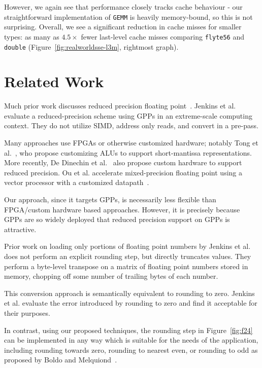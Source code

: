 \documentclass{sig-alternate-05-2015}
\begin{document}
However, we again see that performance closely tracks cache behaviour - our
straightforward implementation of \texttt{GEMM} is heavily memory-bound, so
this is not surprising. Overall, we see a significant reduction in cache misses
for smaller types: as many as $4.5\times$ fewer last-level cache misses
comparing \texttt{flyte56} and \texttt{double}
(Figure~\ref{fig:realworldsse-l3m}, rightmost graph).


\section{Related Work}
\label{sec:related}

Much prior work discusses reduced precision floating
point~\cite{rubio2013precimonious,lam2013automatically,buttari2006exploiting}.
Jenkins et al.~\cite{jenkins2012byte} evaluate a reduced-precision scheme using
GPPs in an extreme-scale computing context. They do not utilize SIMD, address
only reads, and convert in a pre-pass.

Many approaches use FPGAs or otherwise customized hardware; notably Tong et
al.~\cite{tong2000reducing}, who propose customizing ALUs to support
short-mantissa representations. More recently, De Dinechin et
al.~\cite{de2009generating} also propose custom hardware to support reduced
precision. Ou et al. accelerate mixed-precision floating point using a vector
processor with a customized datapath~\cite{ou2015mixed}.

Our approach, since it targets GPPs, is necessarily less flexible than
FPGA/custom hardware based approaches. However, it is precisely because GPPs
are so widely deployed that reduced precision support on GPPs is attractive.

Prior work on loading only portions of floating point numbers by Jenkins et
al.~\cite{jenkins2012byte} does not perform an explicit rounding step, but
directly truncates values. They perform a byte-level transpose on a matrix of
floating point numbers stored in memory, chopping off some number of trailing
bytes of each number.

This conversion approach is semantically equivalent to rounding to zero.
Jenkins et al. evaluate the error introduced by rounding to zero and find it
acceptable for their purposes.

In contrast, using our proposed techniques, the rounding step in
Figure~\ref{fig:f24} can be implemented in any way which is suitable for the
needs of the application, including rounding towards zero, rounding to nearest
even, or rounding to odd as proposed by Boldo and
Melquiond~\cite{boldo2004double}.
\end{document}
